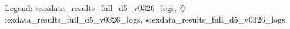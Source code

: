 Legend: {\color{CornflowerBlue}$\circ$}:exdata\validation\_results\bbob\_full\_d5\_v0326\coco\_logs\cmaes, {{}$\diamondsuit$}:exdata\validation\_results\bbob\_full\_d5\_v0326\coco\_logs\ngopt, {\color{Green}$\star$}:exdata\validation\_results\bbob\_full\_d5\_v0326\coco\_logs\stacked
